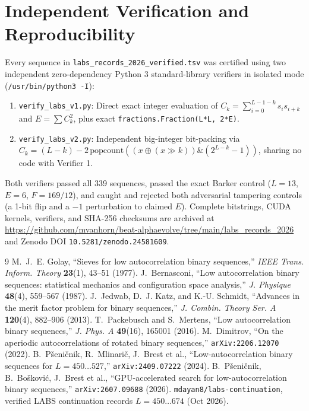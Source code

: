 \documentclass[10.5pt,letterpaper]{article}
\begin{document}
\section{Independent Verification and Reproducibility}

Every sequence in \texttt{labs\_records\_2026\_verified.tsv} was certified using two independent zero-dependency Python 3 standard-library verifiers in isolated mode (\texttt{/usr/bin/python3 -I}):
\begin{enumerate}
\item \texttt{verify\_labs\_v1.py}: Direct exact integer evaluation of $C_k = \sum_{i=0}^{L-1-k} s_i s_{i+k}$ and $E = \sum C_k^2$, plus exact \texttt{fractions.Fraction(L*L, 2*E)}.
\item \texttt{verify\_labs\_v2.py}: Independent big-integer bit-packing via $C_k = (L - k) - 2\,\mathrm{popcount}((x \oplus (x \gg k)) \mathbin{\&} (2^{L-k} - 1))$, sharing no code with Verifier 1.
\end{enumerate}
Both verifiers passed all 339 sequences, passed the exact Barker control ($L = 13$, $E = 6$, $F = 169/12$), and caught and rejected both adversarial tampering controls (a 1-bit flip and a $-1$ perturbation to claimed $E$). Complete bitstrings, CUDA kernels, verifiers, and SHA-256 checksums are archived at \url{https://github.com/mvanhorn/beat-alphaevolve/tree/main/labs_records_2026} and Zenodo DOI \texttt{10.5281/zenodo.24581609}.

\begin{thebibliography}{9}
 M.~J.~E. Golay, ``Sieves for low autocorrelation binary sequences,'' \textit{IEEE Trans. Inform. Theory} \textbf{23}(1), 43--51 (1977).
 J.~Bernasconi, ``Low autocorrelation binary sequences: statistical mechanics and configuration space analysis,'' \textit{J. Physique} \textbf{48}(4), 559--567 (1987).
 J.~Jedwab, D.~J. Katz, and K.-U. Schmidt, ``Advances in the merit factor problem for binary sequences,'' \textit{J. Combin. Theory Ser. A} \textbf{120}(4), 882--906 (2013).
 T.~Packebusch and S.~Mertens, ``Low autocorrelation binary sequences,'' \textit{J. Phys. A} \textbf{49}(16), 165001 (2016).
 M.~Dimitrov, ``On the aperiodic autocorrelations of rotated binary sequences,'' \texttt{arXiv:2206.12070} (2022).
 B.~P\v{s}eni\v{c}nik, R.~Mlinari\v{c}, J.~Brest et al., ``Low-autocorrelation binary sequences for $L = 450\dots 527$,'' \texttt{arXiv:2409.07222} (2024).
 B.~P\v{s}eni\v{c}nik, B.~Bo\v{s}kovi\'{c}, J.~Brest et al., ``GPU-accelerated search for low-autocorrelation binary sequences,'' \texttt{arXiv:2607.09688} (2026).
 \texttt{mdayan8/labs-continuation}, verified LABS continuation records $L = 450\dots 674$ (Oct 2026).
\end{thebibliography}
\end{document}
